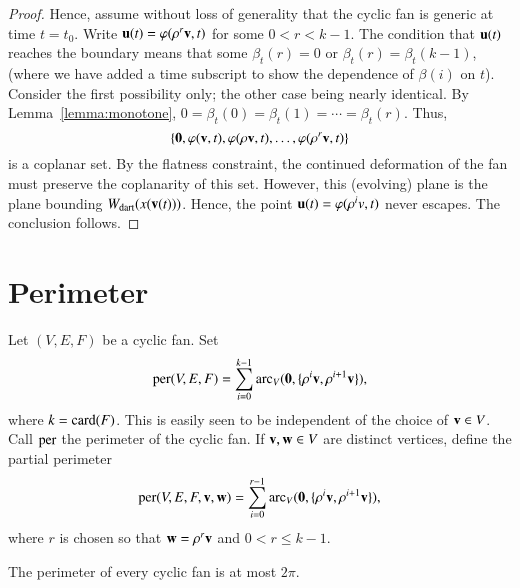 \begin{proof}
Hence, assume without loss of generality that the cyclic fan is generic at time $t=t_0$. Write ${\mathbf u}(t) = \varphi(\rho^r {\mathbf v},t)$ for some $0< r < k-1$.  The condition that ${\mathbf u}(t)$ reaches the boundary means that some $\beta_t(r)=0$ or $\beta_t(r)=\beta_t(k-1)$, (where we have added a time subscript to show the dependence of $\beta(i)$ on $t$).  Consider the first possibility only; the other case being nearly identical.  By Lemma~\ref{lemma:monotone}, $0=\beta_t(0)=\beta_t(1)=\cdots=\beta_t(r)$.  Thus,
$$\{{\mathbf 0},\varphi({\mathbf v},t),\varphi(\rho {\mathbf v},t),\ldots,\varphi(\rho^r {\mathbf v},t)\}$$
is a coplanar set.  By the flatness constraint, the continued deformation of the fan must preserve the coplanarity of this set.  However, this (evolving) plane is the plane bounding $W_{\text{dart}}(x({\mathbf v}(t)))$.  Hence, the point ${\mathbf u}(t) = \varphi(\rho^iv ,t)$ never escapes. The conclusion follows.
\end{proof}





\section{Perimeter}


\begin{definition}[perimeter]\label{lemma:perim}
Let $(V,E,F)$ be a cyclic fan.    Set
$$
{\operatorname{per}}(V,E,F) = \sum_{i=0}^{k-1} \operatorname{arc}_V({\mathbf 0},\{\rho^i {\mathbf v},\rho^{i+1} {\mathbf v}\}), 
$$
where  $k={\operatorname{card}}(F)$.
This is easily seen to be independent of the choice of ${\mathbf v}\in V$.  Call ${\operatorname{per}}$ the perimeter of the cyclic fan.
If ${\mathbf v},{\mathbf w}\in V$ are distinct vertices, define the partial perimeter 
$$
{\operatorname{per}}(V,E,F,{\mathbf v},{\mathbf w}) = \sum_{i=0}^{r-1} \operatorname{arc}_V({\mathbf 0},\{\rho^i {\mathbf v},\rho^{i+1} {\mathbf v}\}), 
$$
where $r$ is chosen so that ${\mathbf w}=\rho^r {\mathbf v}$ and $0<r\le k-1$.
\end{definition}
%
%
%



\begin{lemma}
 The perimeter of every cyclic fan is at most $2\pi$.
\end{lemma}
%
%

